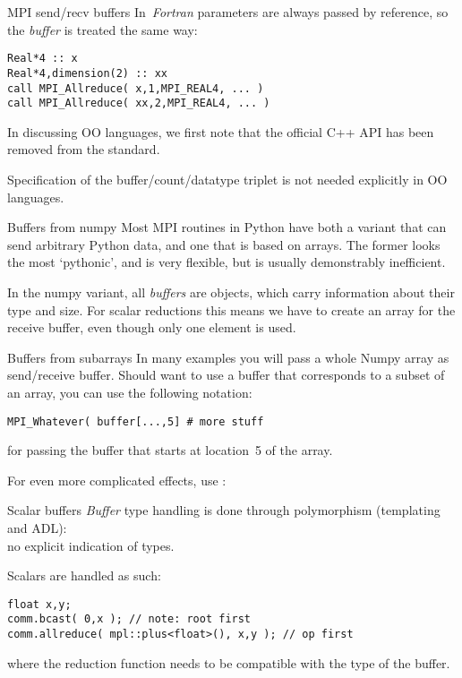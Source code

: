 \begin{fortrannote}{MPI send/recv buffers}
  In~\emph{Fortran} parameters are always passed by reference,
  so the \emph{buffer}
  is treated the same way:
\begin{lstlisting}
Real*4 :: x
Real*4,dimension(2) :: xx
call MPI_Allreduce( x,1,MPI_REAL4, ... )
call MPI_Allreduce( xx,2,MPI_REAL4, ... )
\end{lstlisting}
\end{fortrannote}

In discussing \ac{OO} languages, we first note that
the official C++ \ac{API} has been removed from the standard.

Specification of the buffer/count/datatype triplet is not
needed explicitly in \ac{OO} languages.

\begin{pythonnote}{Buffers from numpy}
  Most MPI routines in Python have both a variant that can send arbitrary Python data,
  and one that is based on  arrays.
  The former looks the most `pythonic', and is very flexible,
  but is usually demonstrably inefficient.

  In the numpy variant, all \emph{buffers}
  are  objects, which carry information about their type and size.
  For scalar reductions this means we have to create an array for the receive buffer,
  even though only one element is used.
\end{pythonnote}

\begin{pythonnote}{Buffers from subarrays}
  In many examples you will pass a whole Numpy array as send/receive buffer.
  Should want to use a buffer that corresponds to a subset of an array,
  you can use the following notation:
\begin{lstlisting}
MPI_Whatever( buffer[...,5] # more stuff    
\end{lstlisting}
for passing the buffer that starts at location~5 of the array.

For even more complicated effects, use :

\end{pythonnote}

\begin{mplnote}{Scalar buffers}
  \label{mpl:buf-scalar}
  \emph{Buffer} type handling
  is done through polymorphism (templating and ADL): \\
  no explicit indication of types.

  Scalars are handled as such:
\begin{lstlisting}
float x,y;
comm.bcast( 0,x ); // note: root first
comm.allreduce( mpl::plus<float>(), x,y ); // op first
\end{lstlisting}
where the reduction function needs to be compatible with the type of the buffer.
\end{mplnote}

